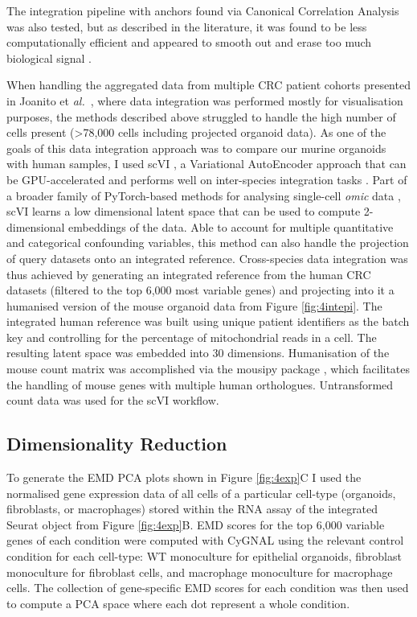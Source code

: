 The integration pipeline with anchors found via Canonical Correlation Analysis was also tested, but as described in the literature, it was found to be less computationally efficient and appeared to smooth out and erase too much biological signal \cite{stuart_integrative_2019}. 

When handling the aggregated data from multiple CRC patient cohorts presented in Joanito et \emph{al.}~\cite{joanito_single-cell_2022}, where data integration was performed mostly for visualisation purposes, the methods described above struggled to handle the high number of cells present (\textgreater78,000 cells including projected organoid data). As one of the goals of this data integration approach was to compare our murine organoids with human samples, I used scVI \cite{lopez_deep_2018}, a Variational AutoEncoder approach that can be GPU-accelerated and performs well on inter-species integration tasks \cite{song_benchmarking_2023}. Part of a broader family of PyTorch-based methods for analysing single-cell \emph{omic} data \cite{gayoso_python_2022}, scVI learns a low dimensional latent space that can be used to compute 2-dimensional embeddings of the data. Able to account for multiple quantitative and categorical confounding variables, this method can also handle the projection of query datasets onto an integrated reference.
Cross-species data integration was thus achieved by generating an integrated reference from the human CRC datasets (filtered to the top 6,000 most variable genes) and projecting into it a humanised version of the mouse organoid data from Figure \ref{fig:4intepi}. The integrated human reference was built using unique patient identifiers as the batch key and controlling for the percentage of mitochondrial reads in a cell. The resulting latent space was embedded into 30 dimensions. Humanisation of the mouse count matrix was accomplished via the mousipy package \cite{peidli_mousipy_2023}, which facilitates the handling of mouse genes with multiple human orthologues. Untransformed count data was used for the scVI workflow. 

\subsection{Dimensionality Reduction}

To generate the EMD PCA plots shown in Figure \ref{fig:4exp}C I used the normalised gene expression data of all cells of a particular cell-type (organoids, fibroblasts, or macrophages) stored within the RNA assay of the integrated Seurat object from Figure \ref{fig:4exp}B. EMD scores for the top 6,000 variable genes of each condition were computed with CyGNAL \cite{ferran_cardoso_tape-labcygnal_2021} using the relevant control condition for each cell-type: WT monoculture for epithelial organoids, fibroblast monoculture for fibroblast cells, and macrophage monoculture for macrophage cells. The collection of gene-specific EMD scores for each condition was then used to compute a PCA space where each dot represent a whole condition.

